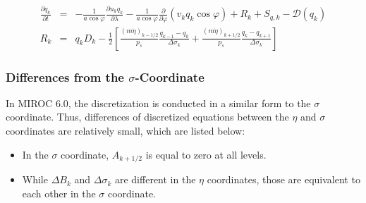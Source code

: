 \begin{eqnarray}
  \frac{\partial q_k}{\partial t}
      &=&   - \frac{1}{a\cos\varphi}
               \frac{\partial u_k q_k}{\partial \lambda}
          - \frac{1}{a\cos\varphi}
               \frac{\partial }{\partial \varphi} ( v_k q_k\cos\varphi)
          + R_k
          + S_{q,k}
          - {\mathcal D}(q_k) \\
R_k  &=&  q_k D_k
       - \frac{1}{2}
             \left[   \frac{(m\dot{\eta})_{k-1/2}}{p_s} \frac{q_{k-1} - q_k}{\Delta\sigma_k}
               + \frac{(m\dot{\eta})_{k+1/2}}{p_s} \frac{q_k   - q_{k+1}}{\Delta\sigma_k} \right]  \end{eqnarray}

\hypertarget{differences-from-the-sigma-coordinate}{%
\subsubsection{\texorpdfstring{Differences from the \(\sigma\)-Coordinate}{Differences from the \textbackslash sigma-Coordinate}}\label{differences-from-the-sigma-coordinate}}

In MIROC 6.0, the discretization is conducted in a similar form to the \(\sigma\) coordinate. Thus, differences of discretized equations between the \(\eta\) and \(\sigma\) coordinates are relatively
small, which are listed below:

\begin{itemize}
\item
  In the \(\sigma\) coordinate, \(A_{k+1/2}\) is equal to zero at all levels.
\item
  While \(\Delta B_k\) and \(\Delta \sigma_k\) are different in the \(\eta\) coordinates, those are equivalent to each other in the \(\sigma\) coordinate.
\end{itemize}
